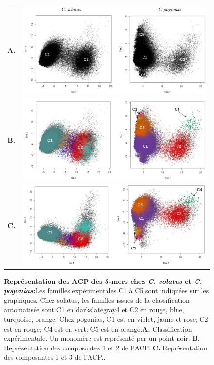 \documentclass[12pt,a4paper]{article}
\begin{document}
	\begin{figure}	
		\begin{tabular}{cc} 
			\textbf{A.} & \includegraphics[scale=0.4]{img/ACP1.png}  \\
			\textbf{B.} & \includegraphics[scale=0.4]{img/ACP2.png}  \\
			\textbf{C.} & \includegraphics[scale=0.4]{img/ACP3.png}   \\
		\end{tabular}
\caption{\textbf{Représentation des ACP des 5-mers chez \textit{C. solatus} et \textit{C. pogonias}:}Les familles expérimentales C1 à C5 sont indiquées sur les graphiques. Chez solatus, les familles issues de la classification automatisée sont C1 en darkslategray4 et C2 en rouge, blue, turquoise, orange. Chez pogonias, C1 est en violet, jaune et rose; C2 est en rouge; C4 est en vert; C5 est en orange.\textbf{A.} Classification expérimentale. Un monomère est représenté par un point noir. \textbf{B.} Représentation des composantes 1 et 2 de l'ACP. \textbf{C.} Représentation des composantes 1 et 3 de l'ACP..} 
\end{figure}
		
\end{document}
